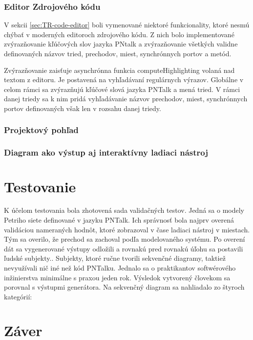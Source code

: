 \subsection{Editor Zdrojového kódu}

V sekcii \ref{sec:TR-code-editor} boli vymenované niektoré funkcionality, ktoré nesmú chýbať v moderných editoroch zdrojového kódu. Z nich bolo implementované zvýrazňovanie kľúčových slov jazyka PNtalk a zvýrazňovanie všetkých validne definovaných názvov tried, prechodov, miest, synchrónnych portov a metód.

Zvýrazňovanie zaisťuje asynchrónna funkcia computeHighlighting volaná nad textom z editoru. Je postavená na vyhľadávaní regulárnych výrazov. Globálne v celom rámci sa zvýrazňujú kľúčové slová jazyka PNTalk a mená tried. V rámci danej triedy sa k nim pridá vyhľadávanie názvov prechodov, miest, synchrónnych portov definovaných však len v rozsahu danej triedy.

\subsection{Projektový pohľad}

\subsection{Diagram ako výstup aj interaktívny ladiaci nástroj}

\chapter{Testovanie}

K účelom testovania bola zhotovená sada validačných testov. Jedná sa o modely Petriho siete definované v jazyku PNTalk.
Ich správnosť bola najprv overená validáciou nameraných hodnôt, ktoré zobrazoval v čase ladiaci nástroj v miestach.
Tým sa overilo, že prechod sa zachoval podľa modelovaného systému. Po overení dát sa vygenerované výstupy odložili a rovnakú pred rovnakú úľohu sa postavili ľudské subjekty.. Subjekty, ktoré ručne tvorili sekvenčné diagramy, taktiež nevyužívali nič iné než kód PNTalku. Jednalo sa o praktikantov softwérového inžinierstva minimálne s praxou jeden rok.
Výsledok vytvorený človekom sa porovnal s výstupmi generátora.
Na sekvenčný diagram sa nahliadalo zo štyroch kategórií:

\chapter{Záver}

